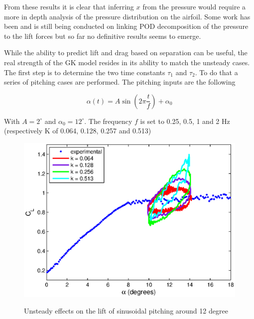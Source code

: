 \par From these results it is clear that inferring $x$ from the pressure would require a more in depth analysis of the pressure distribution on the airfoil.
Some work has been and is still being conducted on linking POD decomposition of the pressure to the lift forces but so far no definitive results seems to emerge.



While the ability to predict lift and drag based on separation can be useful, the real strength of the GK model resides in its ability to match the unsteady cases.
The first step is to determine the two time constants $\tau_1$ and $\tau_2$. 
To do that a series of pitching cases are performed. 
The pitching inputs are the following

\begin{equation}
	\alpha\left( t \right)= A \sin \left( 2 \pi \frac{t}{f} \right) + \alpha_0
	\label{eqn:pitch_input}
\end{equation}

With $A=2^\circ$ and $\alpha_0=12^\circ$.
The frequency $f$ is set to 0.25, 0.5, 1 and 2 Hz (respectively K of 0.064, 0.128, 0.257 and 0.513)

\begin{figure}[h]
  \begin{center}
    \scalebox{1.0}  
    {\includegraphics{./Figures/Pitching_allcases_CL_12_amp_2.eps}}
  \end{center}
  \caption{Unsteady effects on the lift of sinusoidal pitching around 12 degree} 
  \label{fig:Pitching_allcases_Cl_12}
\end{figure}

